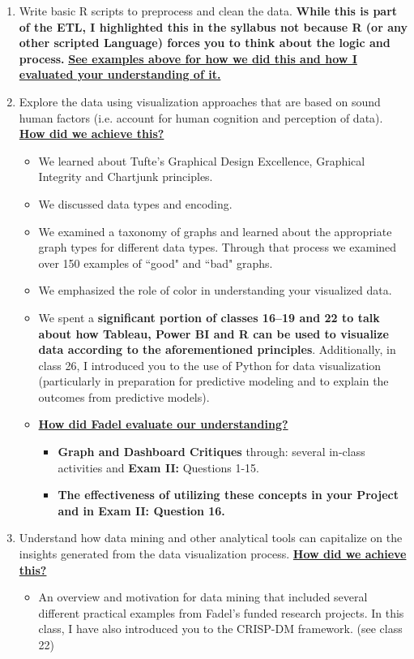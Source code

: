 \documentclass[letterpaper,12pt]{article}
\begin{document}
\begin{enumerate}[label=(\Alph*)]
	\item Write basic R scripts to preprocess and clean the data. \textbf{While this is part of the ETL, I highlighted this in the syllabus not because \textbf{\textbf{R}} (or any other scripted Language) forces you to think about the logic and process.} \textbf{\ul{See examples above for how we did this and how I evaluated your understanding of it.}}
	\item Explore the data using visualization approaches that are based on sound human factors (i.e. account for human cognition and perception of data). \textbf{\ul{How did we achieve this?}}
	\begin{itemize}[nosep]
		\item We learned about Tufte's Graphical Design Excellence, Graphical Integrity and Chartjunk principles.
		\item We discussed data types and encoding. 
		\item We examined a taxonomy of graphs and learned about the appropriate graph types for different data types. Through that process we examined over 150 examples of ``good" and ``bad" graphs.
		\item We emphasized the role of color in understanding your visualized data. 
		\item We spent a \textbf{significant portion of classes 16--19 and 22 to talk about how Tableau, Power BI and R can be used to visualize data according to the aforementioned principles}. Additionally, in class 26, I introduced you to the use of Python for data visualization (particularly in preparation for predictive modeling and to explain the outcomes from predictive models).
		\item \textbf{\ul{How did Fadel evaluate our understanding?}}
		\begin{itemize}
			\item \textbf{Graph and Dashboard Critiques} through: several in-class activities and  \textbf{Exam II:} Questions 1-15.
			\item \textbf{The effectiveness of utilizing these concepts in your Project and in Exam II: Question 16.}
		\end{itemize}
	\end{itemize}
	\item Understand how data mining and other analytical tools can capitalize on the insights generated from the data visualization process. \textbf{\ul{How did we achieve this?}}
	\begin{itemize}[nosep]
		\item An overview and motivation for data mining that included several different practical examples from Fadel's funded research projects. In this class, I have also introduced you to the CRISP-DM framework. (see class 22)

\end{itemize}
\end{enumerate}
\end{document}
